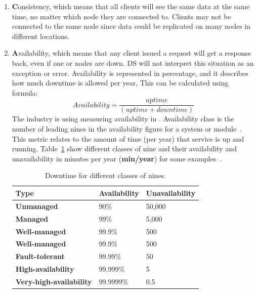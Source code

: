 \begin{enumerate} [start=1,label={(\bfseries \arabic*)}]
	\item \textbf{C}onsistency, which means that all clients will see the same data at the same time, no matter which node they are connected to. Clients may not be connected to the same node since data could be replicated on many nodes in different locations.
	\item \textbf{A}vailability, which means that any client issued a request will get a response back, even if one or nodes are down. DS will not interpret this situation as an exception or error. Availability is represented in percentage, and it describes how much downtime is allowed per year, This can be calculated using formula:\\ 
	
	\begin{equation}\label{eq:Availability}
		Availability = \frac{uptime}{ (uptime + downtime)}
	\end{equation}
	The industry is using measuring availability in . Availability class is the number of leading nines in the availability figure for a system or module~\cite{GrayS91}. This metric relates to the amount of time (per year) that service is up and running. Table~\ref{tab:table7} show different classes of nine and their availability and unavailability in minutes per year (\textbf{min/year}) for some examples~\cite{GrayS91}.
	
	\begin{table}[h!]
		\begin{center}
			\begin{tabular}{l|l|l}
				\textbf{Type} & \textbf{Availability} & \textbf{Unavailability} \\
				\hline
				\textbf{Unmanaged} & 90\% & 50,000 \\
				\textbf{Managed} & 99\% & 5,000 \\
				\textbf{Well-managed} & 99.9\% & 500 \\
				\textbf{Well-managed} & 99.9\% & 500 \\
				\textbf{Fault-tolerant} & 99.99\% & 50 \\
				\textbf{High-availability} & 99.999\% & 5 \\
				\textbf{Very-high-availability} & 99.9999\% & 0.5 \\
			\end{tabular}
		\end{center}
		\vspace{-0.5cm}
		\caption{Downtime for different classes of nines.}
		\label{tab:table7}
	\end{table}
	

\end{enumerate}
